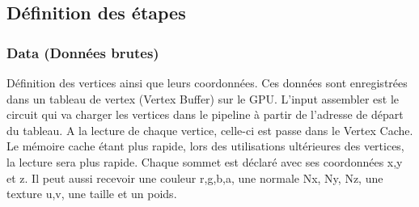 \subsection{Définition des étapes}
\subsubsection{Data (Données brutes)}
Définition des vertices ainsi que leurs coordonnées. Ces données sont enregistrées dans un tableau de vertex (Vertex Buffer) sur le GPU. L’input assembler est le circuit qui va charger les vertices dans le pipeline à partir de l’adresse de départ du tableau. A la lecture de chaque vertice, celle-ci est passe dans le Vertex Cache. Le mémoire cache étant plus rapide, lors des utilisations ultérieures des vertices, la lecture sera plus rapide.
Chaque sommet est déclaré avec ses coordonnées x,y et z. Il peut aussi recevoir une couleur r,g,b,a, une normale Nx, Ny, Nz, une texture u,v, une taille et un poids.
